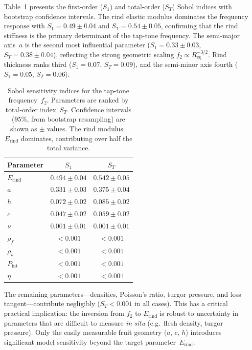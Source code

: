 Table~\ref{tab:sobol_results} presents the first-order ($S_1$) and
total-order ($S_T$) Sobol indices with bootstrap confidence intervals.
The rind elastic modulus dominates
the frequency response with $S_1 = 0.49 \pm 0.04$ and
$S_T = 0.54 \pm 0.05$, confirming
that the rind stiffness is the primary
determinant of the tap-tone frequency.  The semi-major axis~$a$ is the
second most influential parameter ($S_1 = 0.33 \pm 0.03$,
$S_T = 0.38 \pm 0.04$),
reflecting the strong geometric scaling $f_2 \propto R_{\mathrm{eq}}^{-3/2}$.
Rind thickness ranks third ($S_1 = 0.07$, $S_T = 0.09$), and the
semi-minor axis fourth ($S_1 = 0.05$, $S_T = 0.06$).

\begin{table}[t]
  \centering
  \caption{Sobol sensitivity indices for the tap-tone frequency~$f_2$.
    Parameters are ranked by total-order index~$S_T$.  Confidence
    intervals (95\%, from bootstrap resampling) are shown as $\pm$
    values.  The rind modulus~$E_{\mathrm{rind}}$ dominates, contributing
    over half the total variance.}
  \label{tab:sobol_results}
  \begin{tabular}{lcc}
    \toprule
    Parameter & $S_1$ & $S_T$ \\
    \midrule
    $E_{\mathrm{rind}}$     & $0.494 \pm 0.04$ & $0.542 \pm 0.05$ \\
    $a$                     & $0.331 \pm 0.03$ & $0.375 \pm 0.04$ \\
    $h$                     & $0.072 \pm 0.02$ & $0.085 \pm 0.02$ \\
    $c$                     & $0.047 \pm 0.02$ & $0.059 \pm 0.02$ \\
    $\nu$                   & $0.001 \pm 0.01$ & $0.001 \pm 0.01$ \\
    $\rho_f$                & $< 0.001$ & $< 0.001$ \\
    $\rho_w$                & $< 0.001$ & $< 0.001$ \\
    $P_{\mathrm{int}}$      & $< 0.001$ & $< 0.001$ \\
    $\eta$                  & $< 0.001$ & $< 0.001$ \\
    \bottomrule
  \end{tabular}
\end{table}

The remaining parameters---densities, Poisson's ratio, turgor pressure,
and loss tangent---contribute negligibly ($S_T < 0.001$ in all cases).
This has a critical practical implication: the inversion from $f_2$ to
$E_{\mathrm{rind}}$ is robust to uncertainty in parameters that are
difficult to measure \emph{in situ} (e.g.\ flesh density, turgor
pressure).  Only the easily measurable fruit geometry ($a$, $c$, $h$)
introduces significant model sensitivity beyond the target
parameter~$E_{\mathrm{rind}}$.

